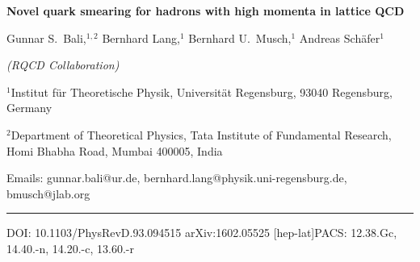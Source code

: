 \documentclass[11pt]{article}
\begin{document}
\begin{center}
  {\LARGE\bfseries Novel quark smearing for hadrons with high momenta in lattice QCD\par}
  \vspace{1.2em}
  {\large Gunnar S.~Bali,$^{1,2}$ Bernhard Lang,$^{1}$ Bernhard U.~Musch,$^{1}$ Andreas Sch\"afer$^{1}$\par}
  \vspace{0.4em}
  {\small\itshape (RQCD Collaboration)\par}
  \vspace{0.8em}
  {\small $^{1}$Institut f\"ur Theoretische Physik, Universit\"at Regensburg, 93040 Regensburg, Germany\par}
  \vspace{0.15em}
  {\small $^{2}$Department of Theoretical Physics, Tata Institute of Fundamental Research, Homi Bhabha Road, Mumbai 400005, India\par}
  \vspace{0.5em}
  {\footnotesize Emails: gunnar.bali@ur.de, bernhard.lang@physik.uni-regensburg.de, bmusch@jlab.org\par}
\end{center}

\vspace{0.4em}
\noindent\rule{\textwidth}{0.4pt}
\vspace{0.15em}
\footnotesize
DOI: 10.1103/PhysRevD.93.094515 \hfill arXiv:1602.05525 [hep-lat]\quad PACS: 12.38.Gc, 14.40.-n, 14.20.-c, 13.60.-r
\normalsize
\vspace{0.6em}

\begin{quote}

\end{quote}








\end{document}
